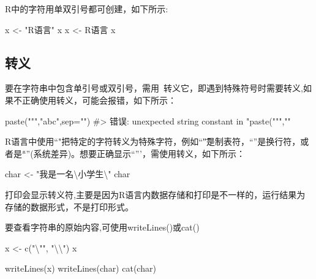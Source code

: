 \documentclass[
]{book}
\newenvironment{Shaded}{\begin{snugshade}}{\end{snugshade}}
\newcommand{\FunctionTok}[1]{\textcolor[rgb]{0.00,0.00,0.00}{#1}}
\newcommand{\NormalTok}[1]{#1}
\newcommand{\OtherTok}[1]{\textcolor[rgb]{0.56,0.35,0.01}{#1}}
\newcommand{\SpecialCharTok}[1]{\textcolor[rgb]{0.00,0.00,0.00}{#1}}
\newcommand{\StringTok}[1]{\textcolor[rgb]{0.31,0.60,0.02}{#1}}
\begin{document}
R中的字符用单双引号都可创建，如下所示:

\begin{Shaded}
\begin{Highlighting}[]
\NormalTok{x }\OtherTok{\textless{}{-}} \StringTok{"R语言"}
\NormalTok{x}
\NormalTok{x }\OtherTok{\textless{}{-}} \StringTok{\textquotesingle{}R语言\textquotesingle{}}
\NormalTok{x}
\end{Highlighting}
\end{Shaded}

\hypertarget{ux8f6cux4e49}{%
\subsection{转义}\label{ux8f6cux4e49}}

要在字符串中包含单引号或双引号，需用~转义它，即遇到特殊符号时需要转义,如果不正确使用转义，可能会报错，如下所示：

\begin{Shaded}
\begin{Highlighting}[]
\FunctionTok{paste}\NormalTok{(}\StringTok{""","}\NormalTok{abc}\StringTok{",sep="")}
\StringTok{\#\textgreater{} 错误: unexpected string constant in "}\FunctionTok{paste}\NormalTok{(}\StringTok{""",""}
\end{Highlighting}
\end{Shaded}

R语言中使用``"把特定的字符转义为特殊字符，例如``\t”是制表符，``\n''是换行符，或者是``\r\n''(系统差异)。想要正确显示``'''，需使用转义，如下所示：

\begin{Shaded}
\begin{Highlighting}[]
\NormalTok{char }\OtherTok{\textless{}{-}} \StringTok{"我是一名}\SpecialCharTok{\textbackslash{}\textquotesingle{}}\StringTok{小学生}\SpecialCharTok{\textbackslash{}\textquotesingle{}}\StringTok{"} 
\NormalTok{char}
\end{Highlighting}
\end{Shaded}

打印会显示转义符,主要是因为R语言内数据存储和打印是不一样的，运行结果为存储的数据形式，不是打印形式。

要查看字符串的原始内容,可使用writeLines()或cat()

\begin{Shaded}
\begin{Highlighting}[]
\NormalTok{x }\OtherTok{\textless{}{-}} \FunctionTok{c}\NormalTok{(}\StringTok{"}\SpecialCharTok{\textbackslash{}"}\StringTok{"}\NormalTok{, }\StringTok{"}\SpecialCharTok{\textbackslash{}\textbackslash{}}\StringTok{"}\NormalTok{)}
\NormalTok{x}

\FunctionTok{writeLines}\NormalTok{(x)}
\FunctionTok{writeLines}\NormalTok{(char)}
\FunctionTok{cat}\NormalTok{(char)}
\end{Highlighting}
\end{Shaded}
\end{document}
